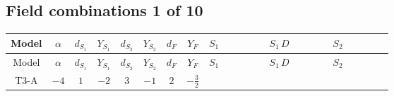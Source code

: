 \documentclass[8pt]{article}
\begin{document}
\begin{landscape}
\subsection*{Field combinations 1 of 10}
\begin{longtable}{@{}cccccccc >{\raggedright\arraybackslash}p{0.21\linewidth} >{\raggedright\arraybackslash}p{0.21\linewidth} >{\raggedright\arraybackslash}p{0.21\linewidth}@{}}
\toprule
Model & $\alpha$ & $d_{S_1}$ & $Y_{S_1}$ & $d_{S_2}$ & $Y_{S_2}$ & $d_F$ & $Y_F$ & $S_1$ & $S_1\,D$ & $S_2$ \\
\midrule
\endfirsthead
\toprule
Model & $\alpha$ & $d_{S_1}$ & $Y_{S_1}$ & $d_{S_2}$ & $Y_{S_2}$ & $d_F$ & $Y_F$ & $S_1$ & $S_1\,D$ & $S_2$ \\
\midrule
\endhead
T3-A & $-4$ & $1$ & $-2$ & $3$ & $-1$ & $2$ & $-\frac{3}{2}$ & \scriptsize\adjustbox{max width=\linewidth}{$\begin{gathered} -\frac{2 \hbar  \overline{y_{1,i_1,r_1}} \overline{y_{1,i_2,r_2}} S_1^2 y_{1,i_1,r_2} y_{1,i_2,r_1} \left(S_1{}^{\dagger }\right){}^2}{\epsilon } \\ -C_{S_1^\dagger S_1} S_1 S_1{}^{\dagger } \\ +C_{S_1^\dagger S_1} \hbar  \overline{y_{1,i_1,r_1}} S_1 y_{1,i_1,r_1} S_1{}^{\dagger }\end{gathered}$} & \scriptsize\adjustbox{max width=\linewidth}{$\begin{gathered} +D_{\mu _1}\left(S_1\right){}^{\dagger } D_{\mu _1}\left(S_1\right)\end{gathered}$} & \scriptsize\adjustbox{max width=\linewidth}{$\begin{gathered} +\frac{2 \hbar  \overline{y_{2,i_1,r_1}} \overline{y_{2,i_2,r_2}} S_{2,j_2}^2 y_{2,i_1,r_2} y_{2,i_2,r_1} \left(S_{2,j_1}{}^{\dagger }\right){}^2}{3 \epsilon } \\ -C_{S_2^\dagger S_2} S_{2,j_1} S_{2,j_1}{}^{\dagger } \\ +\frac{C_{S_2^\dagger S_2} \hbar  \overline{y_{2,i_1,r_1}} S_{2,j_1} y_{2,i_1,r_1} S_{2,j_1}{}^{\dagger }}{\sqrt{3}}\end{gathered}$} \\

\end{longtable}
\end{landscape}
\end{document}
